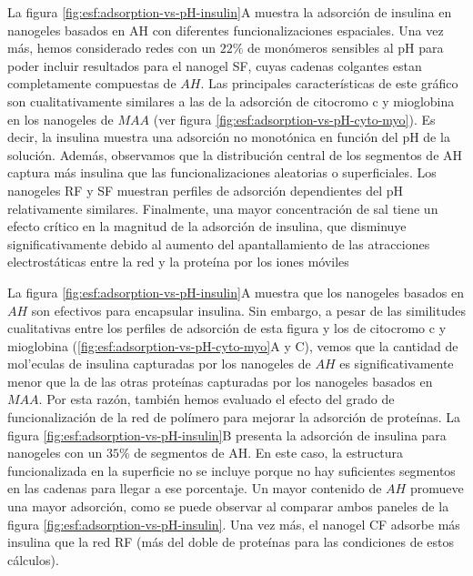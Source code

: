 La figura \ref{fig:esf:adsorption-vs-pH-insulin}A muestra la adsorci\'on de insulina en nanogeles basados en AH con diferentes funcionalizaciones espaciales.
Una vez m\'as, hemos considerado redes con un $22\%$ de mon\'omeros sensibles al pH para poder incluir resultados para el nanogel SF, cuyas cadenas colgantes estan completamente compuestas  de $AH$. 
Las principales caracter\'isticas de este gr\'afico son cualitativamente similares a las de la adsorci\'on de citocromo c y mioglobina en los nanogeles de $MAA$ (ver figura \ref{fig:esf:adsorption-vs-pH-cyto-myo}).
Es decir, la insulina muestra una adsorci\'on no monot\'onica en funci\'on del pH de la soluci\'on.
Adem\'as, observamos que la distribuci\'on central de los segmentos de AH captura m\'as insulina que las funcionalizaciones aleatorias o superficiales.
Los nanogeles RF y SF muestran perfiles de adsorci\'on dependientes del pH relativamente similares.
Finalmente, una mayor concentraci\'on de sal tiene un efecto cr\'itico en la magnitud de la adsorci\'on de insulina, que disminuye significativamente debido al aumento del apantallamiento de las atracciones electrost\'aticas entre la red y la prote\'ina por los iones m\'oviles

La figura \ref{fig:esf:adsorption-vs-pH-insulin}A muestra que los nanogeles basados en $AH$ son efectivos para encapsular insulina.
Sin embargo, a pesar de las similitudes cualitativas entre los perfiles de adsorci\'on de esta figura y los de citocromo c y mioglobina (\ref{fig:esf:adsorption-vs-pH-cyto-myo}A y C), vemos que la cantidad de mol'eculas de insulina capturadas por los nanogeles de $AH$ es significativamente menor que la de las otras prote\'inas capturadas por los nanogeles basados en $MAA$.
Por esta raz\'on, tambi\'en hemos evaluado el efecto del grado de funcionalizaci\'on de la red de pol\'imero para mejorar la adsorci\'on de prote\'inas.
La figura \ref{fig:esf:adsorption-vs-pH-insulin}B presenta la adsorci\'on de insulina para nanogeles con un $35\%$ de segmentos de AH.
En este caso, la estructura funcionalizada en la superficie no se incluye porque no hay suficientes segmentos en las cadenas para llegar a ese porcentaje.
Un mayor contenido de $AH$ promueve una mayor adsorci\'on, como se puede observar al comparar ambos paneles de la figura \ref{fig:esf:adsorption-vs-pH-insulin}.
Una vez m\'as, el nanogel CF adsorbe m\'as insulina que la red RF (m\'as del doble de prote\'inas para las condiciones de estos c\'alculos).




